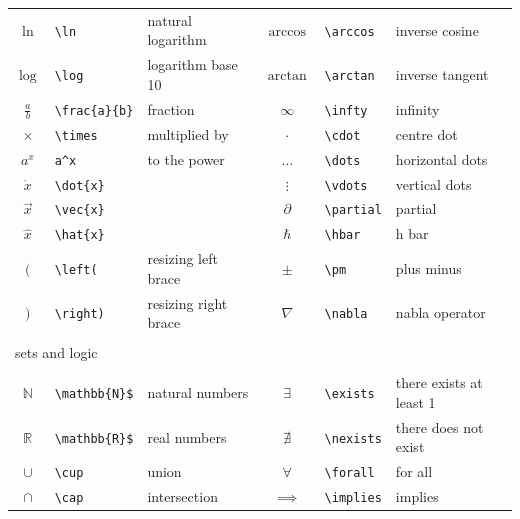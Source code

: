 \begin{table}[ht!]
\begin{tabular}{cll|cll}
        $\ln$	        &	\verb|\ln|	        &	natural logarithm	&	$\arccos$	        &	\verb|\arccos|	        &	inverse cosine	    \\
        $\log$	        &	\verb|\log|	        &	logarithm base 10	&	$\arctan$	        &	\verb|\arctan|	        &	inverse tangent	    \\
        $\frac{a}{b}$	&	\verb|\frac{a}{b}|	&	fraction    	    &	$\infty$	        &	\verb|\infty|	        &	infinity	        \\
        $\times$	    &	\verb|\times|	    &	multiplied by	    &	$\cdot$	            &	\verb|\cdot|	        &	centre dot	        \\
        $a^x$	        &	\verb|a^x|	        &	to the power	    &	$\dots$	            &	\verb|\dots|	        &	horizontal dots	    \\
        $\dot{x}$   	&	\verb|\dot{x}|	    &		                &	$\vdots$	        &	\verb|\vdots|	        &	vertical dots	    \\
        $\vec{x}$	    &	\verb|\vec{x}|	    &		                &	$\partial$	        &	\verb|\partial|	        &	partial	            \\
        $\hat{x}$	    &	\verb|\hat{x}|	    &		                &	$\hbar$	            &	\verb|\hbar|	        &	h bar	            \\
        $\left(\right.$	&	\verb|\left(|	    &	resizing left brace	&	$\pm$	            &	\verb|\pm|	            &   plus minus          \\
        $\left.\right)$	&	\verb|\right)|	    &	resizing right brace&	$\nabla$	        &	\verb|\nabla|	        &	nabla operator		\\
        \\\multicolumn{2}{l}{sets and logic}	&		                &		                &		                    &		                \\\\
        $\mathbb{N}$	&	\verb|\mathbb{N}$|	&	natural numbers	    &	$\exists$	        &	\verb|\exists|	        &	there exists at least 1	\\
        $\mathbb{R}$	&	\verb|\mathbb{R}$|	&	real numbers	    &	$\nexists$	        &	\verb|\nexists|	        &	there does not exist	\\
        $\cup$	        &	\verb|\cup|	        &	union	            &	$\forall$	        &	\verb|\forall|	        &	for all	            \\
        $\cap$	        &	\verb|\cap|	        &	intersection	    &	$\implies$	        &	\verb|\implies|	        &	implies	            \\

\end{tabular}
\end{table}
